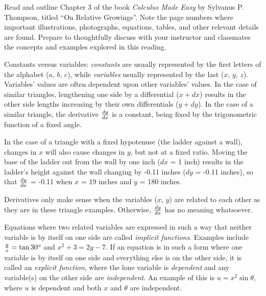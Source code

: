

Read and outline Chapter 3 of the book {\it Calculus Made Easy} by Sylvanus P. Thompson, titled ``On Relative Growings''.  Note the page numbers where important illustrations, photographs, equations, tables, and other relevant details are found.  Prepare to thoughtfully discuss with your instructor and classmates the concepts and examples explored in this reading.














Constants versus variables: {\it constants} are usually represented by the first letters of the alphabet ($a$, $b$, $c$), while {\it variables} usually represented by the last ($x$, $y$, $z$).  Variables' values are often dependent upon other variables' values.  In the case of similar triangles, lengthening one side by a differential ($x + dx$) results in the other side lengths increasing by their own differentials ($y + dy$).  In the case of a similar triangle, the derivative $dy \over dx$ is a constant, being fixed by the trigonometric function of a fixed angle.

In the case of a triangle with a fixed hypotenuse (the ladder against a wall), changes in $x$ will also cause changes in $y$, but not at a fixed ratio.  Moving the base of the ladder out from the wall by one inch ($dx$ = 1 inch) results in the ladder's height against the wall changing by -0.11 inches ($dy$ = -0.11 inches), so that $dy \over dx$ = -0.11 when $x$ = 19 inches and $y$ = 180 inches.

\vskip 10pt

Derivatives only make sense when the variables ($x$, $y$) are related to each other as they are in these triangle examples.  Otherwise, $dy \over dx$ has no meaning whatsoever.

Equations where two related variables are expressed in such a way that neither variable is by itself on one side are called {\it implicit functions}.  Examples include ${y \over x} = \tan 30^o$ and $x^2 + 3 = 2y - 7$.  If an equation is in such a form where one variable is by itself on one side and everything else is on the other side, it is called an {\it explicit function}, where the lone variable is {\it dependent} and any variable(s) on the other side are {\it independent}.  An example of this is $u = x^2 \sin \theta$, where $u$ is dependent and both $x$ and $\theta$ are independent.

